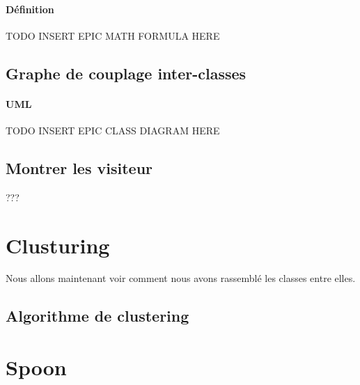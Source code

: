 \documentclass[a4paper]{article}
\begin{document}
\begin{multicols}{2}
        \paragraph{Définition} TODO INSERT EPIC MATH FORMULA HERE 
        \subsection{Graphe de couplage inter-classes}

        \paragraph{UML} TODO INSERT EPIC CLASS DIAGRAM HERE 
        \subsection{Montrer les visiteur}
        ???
        \section{Clusturing}
        Nous allons maintenant voir comment nous avons rassemblé les classes entre elles. 
        \subsection{Algorithme de clustering}
        \section{Spoon}
    \end{multicols}
\end{document}
